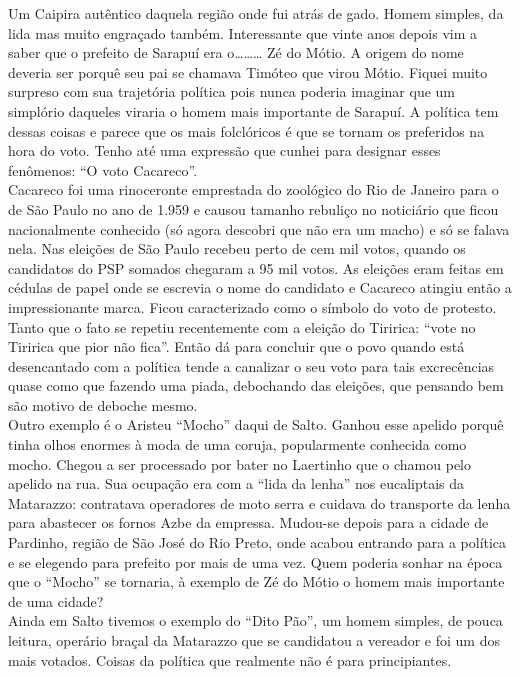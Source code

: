 \documentclass[12pt,brazil,]{book}
\begin{document}
Um Caipira autêntico daquela região onde fui atrás de gado. Homem
simples, da lida mas muito engraçado também. Interessante que vinte anos
depois vim a saber que o prefeito de Sarapuí era
o\ldots{}\ldots{}\ldots{} Zé do Mótio. A origem do nome deveria ser
porquê seu pai se chamava Timóteo que virou Mótio. Fiquei muito surpreso
com sua trajetória política pois nunca poderia imaginar que um simplório
daqueles viraria o homem mais importante de Sarapuí. A política tem
dessas coisas e parece que os mais folclóricos é que se tornam os
preferidos na hora do voto. Tenho até uma expressão que cunhei para
designar esses fenômenos: ``O voto Cacareco''.\\
Cacareco foi uma rinoceronte emprestada do zoológico do Rio de Janeiro
para o de São Paulo no ano de 1.959 e causou tamanho rebuliço no
noticiário que ficou nacionalmente conhecido (só agora descobri que não
era um macho) e só se falava nela. Nas eleições de São Paulo recebeu
perto de cem mil votos, quando os candidatos do PSP somados chegaram a
95 mil votos. As eleições eram feitas em cédulas de papel onde se
escrevia o nome do candidato e Cacareco atingiu então a impressionante
marca. Ficou caracterizado como o símbolo do voto de protesto. Tanto que
o fato se repetiu recentemente com a eleição do Tiririca: ``vote no
Tiririca que pior não fica''. Então dá para concluir que o povo quando
está desencantado com a política tende a canalizar o seu voto para tais
excrecências quase como que fazendo uma piada, debochando das eleições,
que pensando bem são motivo de deboche mesmo.\\
Outro exemplo é o Aristeu ``Mocho'' daqui de Salto. Ganhou esse apelido
porquê tinha olhos enormes à moda de uma coruja, popularmente conhecida
como mocho. Chegou a ser processado por bater no Laertinho que o chamou
pelo apelido na rua. Sua ocupação era com a ``lida da lenha'' nos
eucaliptais da Matarazzo: contratava operadores de moto serra e cuidava
do transporte da lenha para abastecer os fornos Azbe da empressa.
Mudou-se depois para a cidade de Pardinho, região de São José do Rio
Preto, onde acabou entrando para a política e se elegendo para prefeito
por mais de uma vez. Quem poderia sonhar na época que o ``Mocho'' se
tornaria, à exemplo de Zé do Mótio o homem mais importante de uma
cidade?\\
Ainda em Salto tivemos o exemplo do ``Dito Pão'', um homem simples, de
pouca leitura, operário braçal da Matarazzo que se candidatou a vereador
e foi um dos mais votados. Coisas da política que realmente não é para
principiantes.\\
\end{document}

